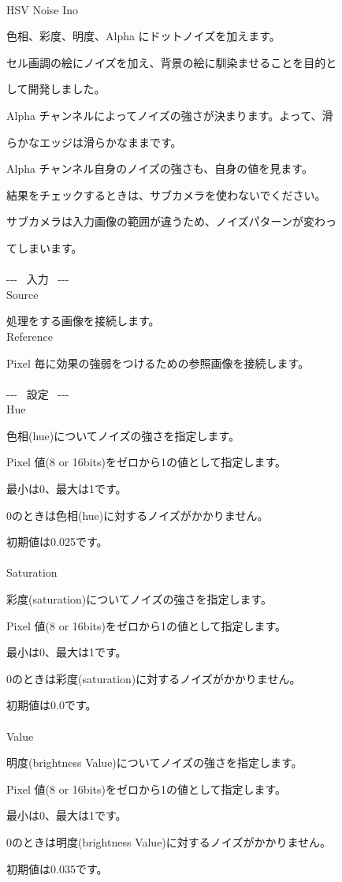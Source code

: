 \documentclass[a4paper,12pt]{article}
\begin{document}
\thispagestyle{empty}

\Large
\noindent \\
HSV Noise Ino\medskip
\par
\normalsize
色相、彩度、明度、Alpha にドットノイズを加えます。\par
セル画調の絵にノイズを加え、背景の絵に馴染ませることを目的と\par
して開発しました。\\
\par
Alpha チャンネルによってノイズの強さが決まります。よって、滑\par
らかなエッジは滑らかなままです。\par
Alpha チャンネル自身のノイズの強さも、自身の値を見ます。\\
\par
結果をチェックするときは、サブカメラを使わないでください。\par
サブカメラは入力画像の範囲が違うため、ノイズパターンが変わっ\par
てしまいます。\\
\\
-{-}- \ 入力 \ -{-}-\\
Source\par
処理をする画像を接続します。\\
Reference\par
Pixel 毎に効果の強弱をつけるための参照画像を接続します。\\
\\
-{-}- \ 設定 \ -{-}-\\
Hue\par
色相(hue)についてノイズの強さを指定します。\par
Pixel 値(8 or 16bits)をゼロから1の値として指定します。\par
最小は0、最大は1です。\par
0のときは色相(hue)に対するノイズがかかりません。\par
初期値は0.025です。\\
\\
Saturation\par
彩度(saturation)についてノイズの強さを指定します。\par
Pixel 値(8 or 16bits)をゼロから1の値として指定します。\par
最小は0、最大は1です。\par
0のときは彩度(saturation)に対するノイズがかかりません。\par
初期値は0.0です。\\
\\
Value\par
明度(brightness Value)についてノイズの強さを指定します。\par
Pixel 値(8 or 16bits)をゼロから1の値として指定します。\par
最小は0、最大は1です。\par
0のときは明度(brightness Value)に対するノイズがかかりません。\par
初期値は0.035です。
\end{document}
